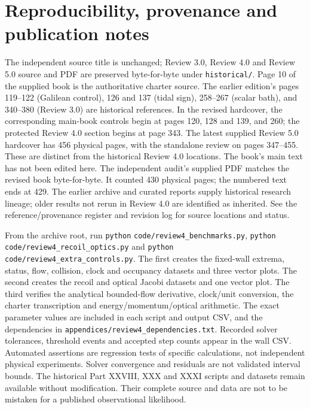\documentclass[
  11pt,
  twoside]{article}
\begin{document}
\section{Reproducibility, provenance and publication
notes}\label{reproducibility-provenance-and-publication-notes}

The independent source title is unchanged; Review 3.0, Review 4.0 and
Review 5.0 source and PDF are preserved byte-for-byte under
\nolinkurl{historical/}. Page 10 of the supplied book is the
authoritative charter source. The earlier edition's pages 119--122
(Galilean control), 126 and 137 (tidal sign), 258--267 (scalar bath),
and 340--380 (Review 3.0) are historical references. In the revised
hardcover, the corresponding main-book controls begin at pages 120, 128
and 139, and 260; the protected Review 4.0 section begins at page 343.
The latest supplied Review 5.0 hardcover has 456 physical pages, with
the standalone review on pages 347--455. These are distinct from the
historical Review 4.0 locations. The book's main text has not been
edited here. The independent audit's supplied PDF matches the revised
book byte-for-byte. It counted 430 physical pages; the numbered text
ends at 429. The earlier archive and curated reports supply historical
research lineage; older results not rerun in Review 4.0 are identified
as inherited. See the reference/provenance register and revision log for
source locations and status.

From the archive root, run \texttt{python}
\nolinkurl{code/review4_benchmarks.py}, \texttt{python}
\nolinkurl{code/review4_recoil_optics.py} and \texttt{python}
\nolinkurl{code/review4_extra_controls.py}. The first creates the
fixed-wall extrema, status, flow, collision, clock and occupancy
datasets and three vector plots. The second creates the recoil and
optical Jacobi datasets and one vector plot. The third verifies the
analytical bounded-flow derivative, clock/unit conversion, the charter
transcription and energy/momentum/optical arithmetic. The exact
parameter values are included in each script and output CSV, and the
dependencies in \nolinkurl{appendices/review4_dependencies.txt}.
Recorded solver tolerances, threshold events and accepted step counts
appear in the wall CSV. Automated assertions are regression tests of
specific calculations, not independent physical experiments. Solver
convergence and residuals are not validated interval bounds. The
historical Part XXVIII, XXX and XXXI scripts and datasets remain
available without modification. Their complete source and data are not
to be mistaken for a published observational likelihood.
\end{document}
